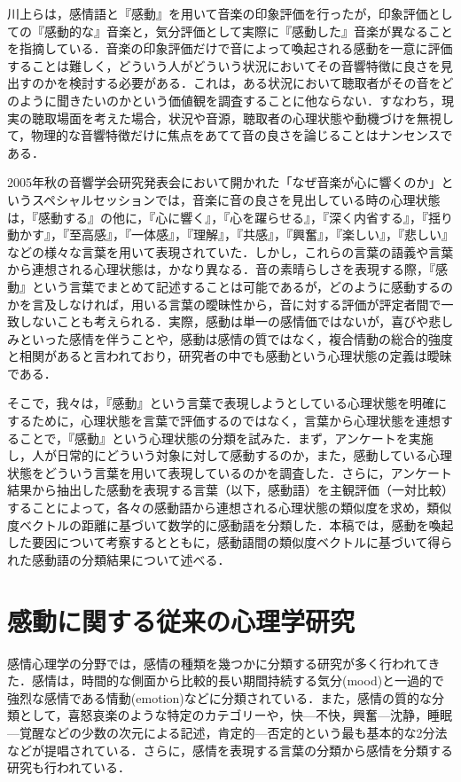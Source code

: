 \documentclass[japanese]{jnlp_1.3c}
\begin{document}
川上ら\cite{Inproc_201}は，感情語と『感動』を用いて音楽の印象評価を行ったが，印象評価としての『感動的な』音楽と，気分評価として実際に『感動した』音楽が異なることを指摘している．音楽の印象評価だけで音によって喚起される感動を一意に評価することは難しく，どういう人がどういう状況においてその音響特徴に良さを見出すのかを検討する必要がある．これは，ある状況において聴取者がその音をどのように聞きたいのかという価値観を調査することに他ならない．すなわち，現実の聴取場面を考えた場合，状況や音源，聴取者の心理状態や動機づけを無視して，物理的な音響特徴だけに焦点をあてて音の良さを論じることはナンセンスである．


2005年秋の音響学会研究発表会において開かれた「なぜ音楽が心に響くのか」というスペシャルセッションでは，音楽に音の良さを見出している時の心理状態は，『感動する』の他に，『心に響く』，『心を躍らせる』，『深く内省する』，『揺り動かす』，『至高感』，『一体感』，『理解』，『共感』，『興奮』，『楽しい』，『悲しい』などの様々な言葉を用いて表現されていた\cite{Inproc_202}\cite{Inproc_204}．しかし，これらの言葉の語義や言葉から連想される心理状態は，かなり異なる．音の素晴らしさを表現する際，『感動』という言葉でまとめて記述することは可能であるが，どのように感動するのかを言及しなければ，用いる言葉の曖昧性から，音に対する評価が評定者間で一致しないことも考えられる．実際，感動は単一の感情価ではないが，喜びや悲しみといった感情を伴う\cite{Article_006}ことや，感動は感情の質ではなく，複合情動の総合的強度と相関がある\cite{Inproc_203}と言われており，研究者の中でも感動という心理状態の定義は曖昧である．


そこで，我々は，『感動』という言葉で表現しようとしている心理状態を明確にするために，心理状態を言葉で評価するのではなく，言葉から心理状態を連想することで，『感動』という心理状態の分類を試みた．まず，アンケートを実施し，人が日常的にどういう対象に対して感動するのか，また，感動している心理状態をどういう言葉を用いて表現しているのかを調査した．さらに，アンケート結果から抽出した感動を表現する言葉（以下，感動語）を主観評価（一対比較）することによって，各々の感動語から連想される心理状態の類似度を求め，類似度ベクトルの距離に基づいて数学的に感動語を分類した．本稿では，感動を喚起した要因について考察するとともに，感動語間の類似度ベクトルに基づいて得られた感動語の分類結果について述べる．



\section{感動に関する従来の心理学研究}

感情心理学の分野では，感情の種類を幾つかに分類する研究が多く行われてきた．感情は，時間的な側面から比較的長い期間持続する気分(mood)と一過的で強烈な感情である情動(emotion)などに分類されている\cite{Book_104}．また，感情の質的な分類として，喜怒哀楽のような特定のカテゴリー\cite{Book_108}\cite{Book_301}\cite{Book_302}や，快—不快，興奮—沈静，睡眠—覚醒などの少数の次元による記述\cite{Book_109}\cite{Article_002}，肯定的—否定的という最も基本的な2分法などが提唱されている．さらに，感情を表現する言葉の分類から感情を分類する研究も行われている\cite{Article_004}\cite{Article_003}\cite{Article_005}．
\end{document}
